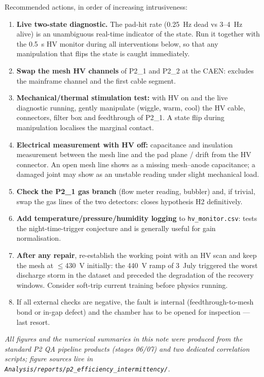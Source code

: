 \documentclass[11pt,a4paper]{article}
\newcommand{\detone}{P2\_1}
\newcommand{\dettwo}{P2\_2}
\begin{document}
\noindent Recommended actions, in order of increasing intrusiveness:
\begin{enumerate}
  \item \textbf{Live two-state diagnostic.} The pad-hit rate (0.25~Hz dead
  vs 3--4~Hz alive) is an unambiguous real-time indicator of the state. Run
  it together with the 0.5~s HV monitor during all interventions below, so
  that any manipulation that flips the state is caught immediately.
  \item \textbf{Swap the mesh HV channels} of \detone{} and \dettwo{} at the
  CAEN: excludes the mainframe channel and the first cable segment.
  \item \textbf{Mechanical/thermal stimulation test:} with HV on and the
  live diagnostic running, gently manipulate (wiggle, warm, cool) the HV
  cable, connectors, filter box and feedthrough of \detone. A state flip
  during manipulation localises the marginal contact.
  \item \textbf{Electrical measurement with HV off:} capacitance and
  insulation measurement between the mesh line and the pad plane / drift
  from the HV connector. An open mesh line shows as a missing
  mesh--anode capacitance; a damaged joint may show as an unstable reading
  under slight mechanical load.
  \item \textbf{Check the \detone{} gas branch} (flow meter reading,
  bubbler) and, if trivial, swap the gas lines of the two detectors:
  closes hypothesis H2 definitively.
  \item \textbf{Add temperature/pressure/humidity logging} to
  \texttt{hv\_monitor.csv}: tests the night-time-trigger conjecture and is
  generally useful for gain normalisation.
  \item \textbf{After any repair}, re-establish the working point with an HV
  scan and keep the mesh at $\leq$430~V initially: the 440~V ramp of 3~July
  triggered the worst discharge storm in the dataset and preceded the
  degradation of the recovery windows. Consider soft-trip current training
  before physics running.
  \item If all external checks are negative, the fault is internal
  (feedthrough-to-mesh bond or in-gap defect) and the chamber has to be
  opened for inspection --- last resort.
\end{enumerate}

\vspace{2ex}
\noindent\textit{All figures and the numerical summaries in this note were
produced from the standard P2 QA pipeline products (stages 06/07) and two
dedicated correlation scripts; figure sources live in
\texttt{Analysis/reports/p2\_efficiency\_intermittency/}.}
\end{document}
